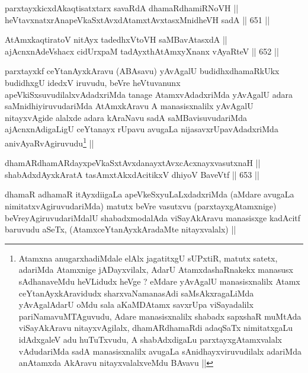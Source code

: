 \begin{shl}
parxtayxkicxdAkaqtisatxtarx savaRdA dhamaRdhamiRNoVH || \\
heVtavxnatxrAnapeVkaSxtAvxdAtamxtAvxtasxMnidheVH sadA ||  651 ||  
\end{shl}
				
\begin{shl}
AtAmxkaqtiratoV nitAyx tadedhxVtoVH saMBavAtasxdA || \\
ajAcnxnAdeVshacx cidUrxpaM tadAyxthAtAmxyXnanx vAyaRteV ||  652 ||  
\end{shl}

\begin{artha}
parxtayxkf ceYtanAyxkAravu (ABAsavu) yAvAgalU budidhxdhamaRkUkx
budidhxgU idedxV iruvudu, beVre heVtuvanunx
apeVkiSxsuvudilalxvAdadxriMda  tanage AtamxvAdadxriMda yAvAgalU adara
saMnidhiyiruvudariMda AtAmxkAravu A manasisxnalilx yAvAgalU
nitayxvAgide alalxde adara kAraNavu sadA saMBavisuvudariMda
ajAcnxnAdigaLigU ceYtanayx rUpavu avugaLa nijasavxrUpavAdadxriMda
anivAyaRvAgiruvudu\footnote{Atamxna anugarxhadiMdale elAlx jagatitxgU
  sUPxtiR, matutx satetx, adariMda Atamxnige jADayxvilalx, AdarU
  AtamxdashaRnakekx manasusx sAdhanaveMdu heVLidudx heVge ? eMdare
  yAvAgalU manasisxnalilx Atamx ceYtanAyxkAravidudx sharxvaNamanasAdi
  saMsAkxragaLiMda yAvAgalAdarU oMdu sala aKaMDAtamx savxrUpa
  viSayadalilx pariNamavuMTAguvudu, Adare manasisxnalilx shabadx
  sapxshaR muMtAda viSayAkAravu nitayxvAgilalx, dhamARdhamaRdi
  adaqSaTx nimitatxgaLu idAdxgaleV adu huTuTxvudu, A shabAdxdigaLu
  parxtayxgAtamxvalalx vAdudariMda sadA manasisxnalilx avugaLa
  sAnidhayxviruvudilalx adariMda anAtamxda AkAravu nitayxvalalxveMdu
  BAvavu ||} ||
\end{artha}


\begin{shl}
dhamARdhamARdayxpeVkaSxtAvxdanayxtAvxcAcxnayxvasutxnaH || \\
shabAdxdAyxkAratA tasAmxtAkxdAcitikxV dhiyoV BaveVtf ||  653 ||  
\end{shl}

\begin{artha}
dhamaR adhamaR itAyxdiigaLa apeVkeSxyuLaLxdadxriMda (aMdare avugaLa
nimitatxvAgiruvudariMda) matutx beVre vasutxvu (parxtayxgAtamxnige)
beVreyAgiruvudariMdalU shabadxmodalAda viSayAkAravu manasisxge
kadAcitf baruvudu aSeTx, (AtamxceYtanAyxkAradaMte nitayxvalalx) ||
\end{artha}

